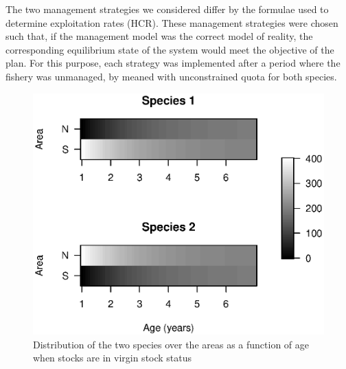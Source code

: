 \documentclass[12pt,oneline,a4paper,numbib]{ouparticle}
\numberwithin{equation}{subsection} %
\begin{document}
The two management strategies we considered differ by the formulae used to determine exploitation rates (HCR). These management strategies were chosen such that, if  the  management  model  was  the  correct  model  of  reality,  the corresponding  equilibrium  state  of  the  system  would  meet  the  objective  of  the  plan. For this purpose, each strategy was implemented after a period where the fishery was unmanaged, by meaned with unconstrained quota for both species.

\begin{figure}[!ht]
\centering
\label{f:distributions}
\includegraphics[width=.69\textwidth]{Figures/Distributions.eps} 
\caption{Distribution of the two species over the areas as a function of age when stocks are in virgin stock status }
\end{figure}


\end{document}
